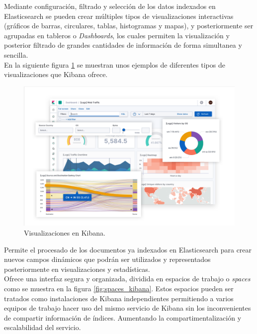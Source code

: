 \documentclass[a4paper, 12pt]{book}
\begin{document}
		Mediante configuración, filtrado y selección de los datos indexados en Elasticsearch se pueden crear múltiples tipos de visualizaciones interactivas (gráficos de barras,  circulares, tablas, histogramas y mapas), y posteriormente ser agrupadas en tableros o \textit{Dashboards}, los cuales permiten la visualización y posterior filtrado de grandes cantidades de información de forma simultanea y sencilla.\\
		
		En la siguiente figura \ref{fig:visualizations_kibana} se muestran unos ejemplos de diferentes tipos de visualizaciones que Kibana ofrece.
		
		\begin{figure}[H]
			\centering
			\includegraphics[width=12cm, keepaspectratio]{img/visualizations_kibana.png}
			\caption{Visualizaciones en Kibana.}
			\label{fig:visualizations_kibana}
		\end{figure}
		
		Permite el procesado de los documentos ya indexados en Elasticsearch para crear nuevos campos dinámicos que podrán ser utilizados y representados posteriormente en visualizaciones y estadísticas.\\
		
		Ofrece una interfaz segura y organizada, dividida en espacios de trabajo o \textit{spaces} como se muestra en la figura \ref{fig:spaces_kibana}. Estos espacios pueden ser tratados como instalaciones de Kibana independientes permitiendo a varios equipos de trabajo hacer uso del mismo servicio de Kibana sin los inconvenientes de compartir información de índices. Aumentando la compartimentalización y escalabilidad del servicio.
		
\end{document}
